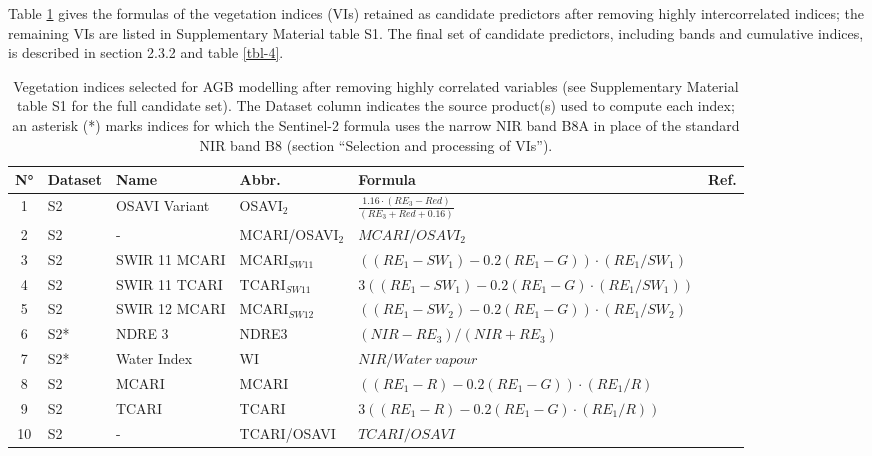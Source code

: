 \documentclass[
  british,
]{interact}
\begin{document}
Table \ref{tbl-3} gives the formulas of the vegetation indices (VIs)
retained as candidate predictors after removing highly intercorrelated
indices; the remaining VIs are listed in Supplementary Material table
S1. The final set of candidate predictors, including bands and
cumulative indices, is described in section 2.3.2 and table \ref{tbl-4}.

\begin{table}[!htbp]
\scriptsize
\centering
\caption{Vegetation indices selected for AGB modelling after removing highly correlated variables (see Supplementary Material table S1 for the full candidate set). The Dataset column indicates the source product(s) used to compute each index; an asterisk (*) marks indices for which the Sentinel-2 formula uses the narrow NIR band B8A in place of the standard NIR band B8 (section ``Selection and processing of VIs'').}
\label{tbl-3}
\renewcommand{\arraystretch}{1.1} %
\begin{tabularx}{\textwidth}{@{} c l >{\raggedright\arraybackslash}p{1.6cm} l >{\raggedright\arraybackslash}X >{\raggedright\arraybackslash}p{2.3cm} @{}}
\toprule
\textbf{N°} & \textbf{Dataset} & \textbf{Name} & \textbf{Abbr.} & \textbf{Formula} & \textbf{Ref.} \\
\midrule
1 & S2 & OSAVI Variant & OSAVI$_2$ & $\frac{1.16 \cdot (RE_3 - Red)}{(RE_3 + Red + 0.16)}$ & \citealt{Jin2020} \\
2 & S2 & - & MCARI/OSAVI$_2$ & $MCARI/OSAVI_2$ & \citealt{Wu2008} \\
3 & S2 & SWIR 11 MCARI & MCARI$_{SW11}$ & $((RE_1 - SW_1) - 0.2(RE_1 - G)) \cdot (RE_1/SW_1)$ & \citealt{Herrmann2011} \\
4 & S2 & SWIR 11 TCARI & TCARI$_{SW11}$ & $3((RE_1 - SW_1) - 0.2(RE_1 - G) \cdot (RE_1/SW_1))$ & \citealt{Herrmann2011} \\
5 & S2 & SWIR 12 MCARI & MCARI$_{SW12}$ & $((RE_1 - SW_2) - 0.2(RE_1 - G)) \cdot (RE_1/SW_2)$ & \citealt{Herrmann2011} \\
6 & S2* & NDRE 3 & NDRE3 & $(NIR - RE_3)/(NIR + RE_3)$ & \citealt{Magney2017} \\
7 & S2* & Water Index & WI & $NIR/Water\ vapour$ & \citealt{Jin2020} \\
8 & S2 & MCARI & MCARI & $((RE_1 - R) - 0.2(RE_1 - G)) \cdot (RE_1/R)$ & \citealt{Daughtry2000} \\
9 & S2 & TCARI & TCARI & $3((RE_1 - R) - 0.2(RE_1 - G) \cdot (RE_1/R))$ & \citealt{Haboudane2002} \\
10 & S2 & - & TCARI/OSAVI & $TCARI/OSAVI$ & \citealt{Haboudane2002} \\

\end{tabularx}
\end{table}
\end{document}

